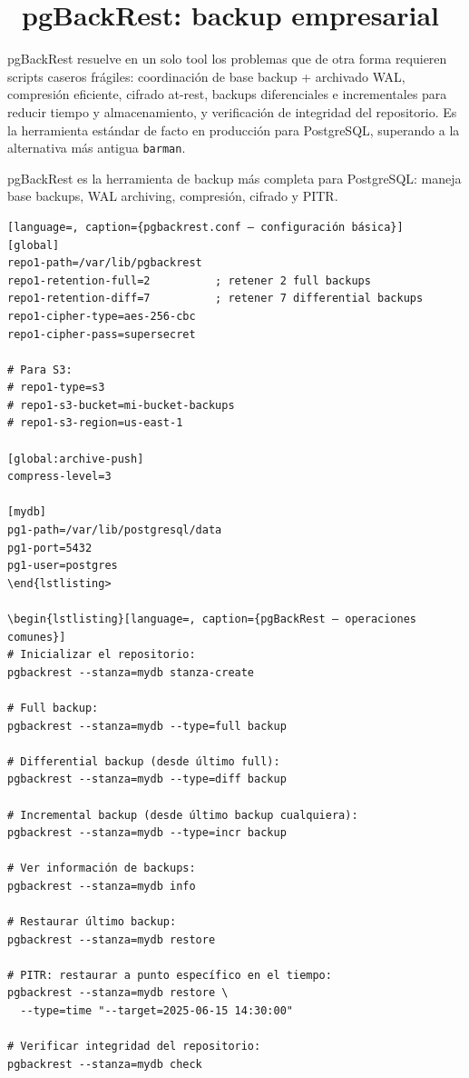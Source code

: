 \section[pgBackRest: backup empresarial]{~pgBackRest: backup empresarial}

pgBackRest resuelve en un solo tool los problemas que de otra forma requieren scripts caseros frágiles: coordinación de base backup + archivado WAL, compresión eficiente, cifrado at-rest, backups diferenciales e incrementales para reducir tiempo y almacenamiento, y verificación de integridad del repositorio.
Es la herramienta estándar de facto en producción para PostgreSQL, superando a la alternativa más antigua \texttt{barman}.

pgBackRest es la herramienta de backup más completa para PostgreSQL: maneja base backups, WAL archiving, compresión, cifrado y PITR.

\begin{lstlisting}[language=, caption={pgbackrest.conf — configuración básica}]
[global]
repo1-path=/var/lib/pgbackrest
repo1-retention-full=2          ; retener 2 full backups
repo1-retention-diff=7          ; retener 7 differential backups
repo1-cipher-type=aes-256-cbc
repo1-cipher-pass=supersecret

# Para S3:
# repo1-type=s3
# repo1-s3-bucket=mi-bucket-backups
# repo1-s3-region=us-east-1

[global:archive-push]
compress-level=3

[mydb]
pg1-path=/var/lib/postgresql/data
pg1-port=5432
pg1-user=postgres
\end{lstlisting>

\begin{lstlisting}[language=, caption={pgBackRest — operaciones comunes}]
# Inicializar el repositorio:
pgbackrest --stanza=mydb stanza-create

# Full backup:
pgbackrest --stanza=mydb --type=full backup

# Differential backup (desde último full):
pgbackrest --stanza=mydb --type=diff backup

# Incremental backup (desde último backup cualquiera):
pgbackrest --stanza=mydb --type=incr backup

# Ver información de backups:
pgbackrest --stanza=mydb info

# Restaurar último backup:
pgbackrest --stanza=mydb restore

# PITR: restaurar a punto específico en el tiempo:
pgbackrest --stanza=mydb restore \
  --type=time "--target=2025-06-15 14:30:00"

# Verificar integridad del repositorio:
pgbackrest --stanza=mydb check
\end{lstlisting}

